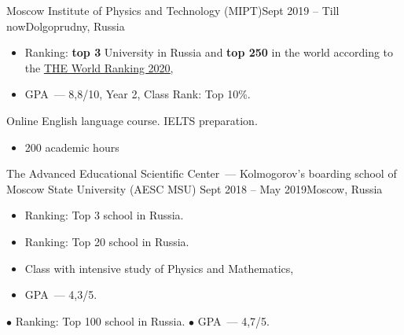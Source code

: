 
{Moscow Institute of Physics and Technology (MIPT)}{Sept 2019 -- Till now}{Dolgoprudny, Russia}
\begin{itemize}
    \item Ranking: \textbf{top 3} University in Russia and \textbf{top 250} in the world according to the
    \href{https://www.timeshighereducation.com/world-university-rankings/2020/world-ranking#!/page/0/length/25/sort_by/rank/sort_order/asc/cols/stats}
    {\underline{THE World Ranking 2020}},
    \item GPA~--- 8,8/10, Year 2, Class Rank: Top 10\%.
\end{itemize}
\divider

Online English language course. IELTS preparation.
\begin{itemize}
    \item 200 academic hours
\end{itemize}

\divider

{The Advanced Educational Scientific Center~--- Kolmogorov’s boarding school of Moscow State University (AESC MSU)}
{Sept 2018 -- May 2019}{Moscow, Russia}
\begin{itemize}
    \item Ranking: Top 3 school in Russia.
\end{itemize}


\begin{itemize}
    \item Ranking: Top 20 school in Russia.
\end{itemize}

\begin{itemize}
    \item Class with intensive study of Physics and Mathematics,
    \item GPA~--- 4,3/5.
\end{itemize}

\divider


$\bullet$ Ranking: Top 100 school in Russia. \qquad $\bullet$ GPA~--- 4,7/5.

